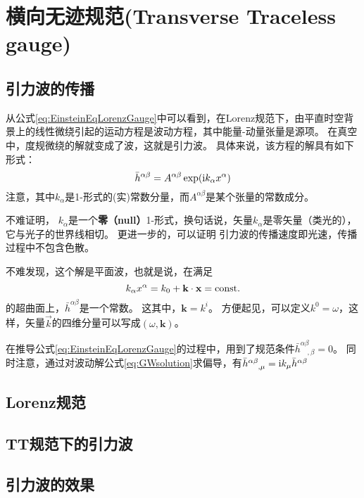 \section{横向无迹规范(Transverse Traceless gauge)}
\subsection{引力波的传播}
从公式\ref{eq:EinsteinEqLorenzGauge}中可以看到，在Lorenz规范下，由平直时空背景上的线性微绕引起的运动方程是波动方程，其中能量-动量张量是源项。
在真空中，度规微绕的解就变成了波，这就是引力波。
具体来说，该方程的解具有如下形式：
\begin{equation}\label{eq:GWsolution} 
  \bar{h}^{\alpha\beta} =  A^{\alpha\beta} \exp({\rm i} k_\alpha x^\alpha)
\end{equation}
注意，其中${k_\alpha}$是1-形式的(实)常数分量，而$A^{\alpha\beta}$是某个张量的常数成分。

不难证明，%
$k_\alpha$是一个{\textbf{零（null）}}1-形式，换句话说，矢量$k_\alpha$是零矢量（类光的），它与光子的世界线相切。
更进一步的，可以证明%
引力波的传播速度即光速，传播过程中不包含色散。%

不难发现，这个解是平面波，也就是说，在满足
\begin{equation}\label{eq:PlaneWave} 
  k_\alpha x^\alpha = k_0+\textbf{k}\cdot\textbf{x} =  {\rm const.}
\end{equation}
的超曲面上，$\bar{h}^{\alpha\beta} $是一个常数。
这其中，$\textbf{k}={k^i}$。
方便起见，可以定义$k^0=\omega$，这样，矢量$\vec{k}$的四维分量可以写成$(\omega,\textbf{k})$。

在推导公式\ref{eq:EinsteinEqLorenzGauge}的过程中，用到了规范条件$\bar{h}^{\alpha\beta}_{\quad,\beta} = 0$。
同时注意，通过对波动解公式\ref{eq:GWsolution}求偏导，有$\bar{h}^{\alpha\beta}_{\quad ,\mu} = {\rm i}k_\mu \bar{h}^{\alpha\beta}$


\subsection{Lorenz规范}

\subsection{TT规范下的引力波}

\subsection{引力波的效果}
